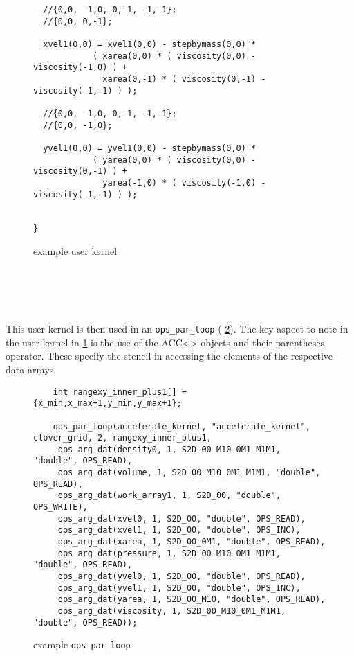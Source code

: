 \documentclass[11pt]{article}
\begin{document}
{\begin{figure}[!h]
\begin{verbatim}
  //{0,0, -1,0, 0,-1, -1,-1};
  //{0,0, 0,-1};

  xvel1(0,0) = xvel1(0,0) - stepbymass(0,0) *
            ( xarea(0,0) * ( viscosity(0,0) - viscosity(-1,0) ) +
              xarea(0,-1) * ( viscosity(0,-1) - viscosity(-1,-1) ) );

  //{0,0, -1,0, 0,-1, -1,-1};
  //{0,0, -1,0};

  yvel1(0,0) = yvel1(0,0) - stepbymass(0,0) *
            ( yarea(0,0) * ( viscosity(0,0) - viscosity(0,-1) ) +
              yarea(-1,0) * ( viscosity(-1,0) - viscosity(-1,-1) ) );


}
\end{verbatim}
\caption{\small example user kernel}
\normalsize\vspace{-0pt}\label{fig:example}
\end{figure}\\\\\\\\


\noindent This user kernel is then used in an \texttt{ops\_par\_loop} (\figurename{ \ref{fig:parloop}}). The key aspect
to note in the user kernel in \figurename{ \ref{fig:example}} is the use of the ACC<> objects and their parentheses operator. These specify the stencil in accessing the elements of the respective data arrays. 

\begin{figure}[!h]\small
\begin{verbatim}
    int rangexy_inner_plus1[] = {x_min,x_max+1,y_min,y_max+1}; 

    ops_par_loop(accelerate_kernel, "accelerate_kernel", clover_grid, 2, rangexy_inner_plus1,
     ops_arg_dat(density0, 1, S2D_00_M10_0M1_M1M1, "double", OPS_READ),
     ops_arg_dat(volume, 1, S2D_00_M10_0M1_M1M1, "double", OPS_READ),
     ops_arg_dat(work_array1, 1, S2D_00, "double", OPS_WRITE),
     ops_arg_dat(xvel0, 1, S2D_00, "double", OPS_READ),
     ops_arg_dat(xvel1, 1, S2D_00, "double", OPS_INC),
     ops_arg_dat(xarea, 1, S2D_00_0M1, "double", OPS_READ),
     ops_arg_dat(pressure, 1, S2D_00_M10_0M1_M1M1, "double", OPS_READ),
     ops_arg_dat(yvel0, 1, S2D_00, "double", OPS_READ),
     ops_arg_dat(yvel1, 1, S2D_00, "double", OPS_INC),
     ops_arg_dat(yarea, 1, S2D_00_M10, "double", OPS_READ),
     ops_arg_dat(viscosity, 1, S2D_00_M10_0M1_M1M1, "double", OPS_READ));
\end{verbatim}
\caption{\small example \texttt{ops\_par\_loop}}
\normalsize\vspace{-0pt}\label{fig:parloop}
\end{figure}


}
\end{document}
